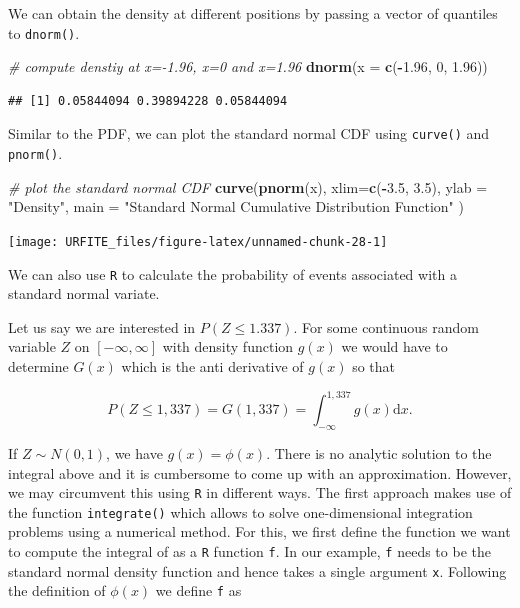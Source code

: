 \documentclass[]{book}
\newenvironment{Shaded}{\begin{snugshade}}{\end{snugshade}}
\newcommand{\KeywordTok}[1]{\textcolor[rgb]{0.13,0.29,0.53}{\textbf{#1}}}
\newcommand{\DataTypeTok}[1]{\textcolor[rgb]{0.13,0.29,0.53}{#1}}
\newcommand{\DecValTok}[1]{\textcolor[rgb]{0.00,0.00,0.81}{#1}}
\newcommand{\FloatTok}[1]{\textcolor[rgb]{0.00,0.00,0.81}{#1}}
\newcommand{\StringTok}[1]{\textcolor[rgb]{0.31,0.60,0.02}{#1}}
\newcommand{\CommentTok}[1]{\textcolor[rgb]{0.56,0.35,0.01}{\textit{#1}}}
\newcommand{\OperatorTok}[1]{\textcolor[rgb]{0.81,0.36,0.00}{\textbf{#1}}}
\newcommand{\NormalTok}[1]{#1}
\theoremstyle{definition}
\theoremstyle{definition}
\theoremstyle{definition}
\theoremstyle{remark}
\begin{document}
We can obtain the density at different positions by passing a vector of
quantiles to \texttt{dnorm()}.

\begin{Shaded}
\begin{Highlighting}[]
\CommentTok{# compute denstiy at x=-1.96, x=0 and x=1.96}
\KeywordTok{dnorm}\NormalTok{(}\DataTypeTok{x =} \KeywordTok{c}\NormalTok{(}\OperatorTok{-}\FloatTok{1.96}\NormalTok{, }\DecValTok{0}\NormalTok{, }\FloatTok{1.96}\NormalTok{))}
\end{Highlighting}
\end{Shaded}

\begin{verbatim}
## [1] 0.05844094 0.39894228 0.05844094
\end{verbatim}

Similar to the PDF, we can plot the standard normal CDF using
\texttt{curve()} and \texttt{pnorm()}.

\begin{Shaded}
\begin{Highlighting}[]
\CommentTok{# plot the standard normal CDF}
\KeywordTok{curve}\NormalTok{(}\KeywordTok{pnorm}\NormalTok{(x), }
      \DataTypeTok{xlim=}\KeywordTok{c}\NormalTok{(}\OperatorTok{-}\FloatTok{3.5}\NormalTok{, }\FloatTok{3.5}\NormalTok{), }
      \DataTypeTok{ylab =} \StringTok{"Density"}\NormalTok{, }
      \DataTypeTok{main =} \StringTok{"Standard Normal Cumulative Distribution Function"}
\NormalTok{      )}
\end{Highlighting}
\end{Shaded}

\begin{center}\texttt{[image: URFITE\_files/figure-latex/unnamed-chunk-28-1]} \end{center}

We can also use \texttt{R} to calculate the probability of events
associated with a standard normal variate.

Let us say we are interested in \(P(Z \leq 1.337)\). For some continuous
random variable \(Z\) on \([-\infty,\infty]\) with density function
\(g(x)\) we would have to determine \(G(x)\) which is the anti
derivative of \(g(x)\) so that

\[ P(Z \leq 1,337 ) = G(1,337) = \int_{-\infty}^{1,337} g(x) \mathrm{d}x.  \]

If \(Z \sim N(0,1)\), we have \(g(x)=\phi(x)\). There is no analytic
solution to the integral above and it is cumbersome to come up with an
approximation. However, we may circumvent this using \texttt{R} in
different ways. The first approach makes use of the function
\texttt{integrate()} which allows to solve one-dimensional integration
problems using a numerical method. For this, we first define the
function we want to compute the integral of as a \texttt{R} function
\texttt{f}. In our example, \texttt{f} needs to be the standard normal
density function and hence takes a single argument \texttt{x}. Following
the definition of \(\phi(x)\) we define \texttt{f} as
\end{document}
